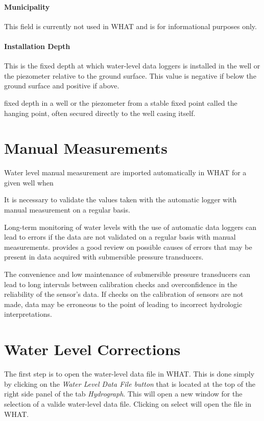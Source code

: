 \documentclass[WHATMANUAL.tex]{subfiles}
\begin{document}
\paragraph{Municipality} This field is currently not used in WHAT and is for informational purposes only.

\paragraph{Installation Depth} This is the fixed depth at which water-level data loggers is installed in the well or the piezometer relative to the ground surface. This value is negative if below the ground surface and positive if above.

fixed depth in a well or the piezometer from a stable fixed point called the hanging point, often secured directly to the well casing itself.

\section{Manual Measurements}

Water level manual measurement are imported automatically in WHAT for a given well when


It is necessary to validate the values taken with the automatic logger with manual measurement on a regular basis.

Long-term monitoring of water levels with the use of automatic data loggers can lead to errors if the data are not validated on a regular basis with manual measurements. \cite{freeman_use_2004} provides a good review on possible causes of errors that may be present in data acquired with submersible pressure transducers.

The convenience and low maintenance of submersible pressure transducers can lead to long intervals between calibration checks and overconfidence in the reliability of the sensor's data. If checks on the calibration of sensors are not made, data may be erroneous to the point of leading to incorrect hydrologic interpretations.

\section{Water Level Corrections}


The first step is to open the water-level data file in WHAT. This is done simply by clicking on the \emph{Water Level Data File button} that is located at the top of the right side panel of the tab \emph{Hydrograph}. This will open a new window for the selection of a valide water-level data file. Clicking on select will open the file in WHAT.
\end{document}
